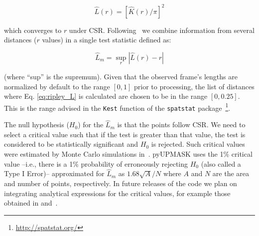 \documentclass[draft]{aa}
\begin{document}
 \begin{equation}
 \hat{L}(r) = [\hat{K}(r)/\pi]^2
 \end{equation}

 \noindent which converges to $r$ under CSR. Following~\cite{Dixon_2014} we
 combine information from several distances ($r$ values) in a single test
 statistic defined as:

 \begin{equation}
 \hat{L}_{m} = \sup_{r} |\hat{L}(r) - r|
 \label{eq:ripley_L}
 \end{equation}

 \noindent (where ``sup'' is the supremum).
 Given that the observed frame's lengths are normalized by default to the
 range $[0,1]$ prior to processing, the list of distances where Eq.
 \ref{eq:ripley_L} is calculated are chosen to be in the range $[0, 0.25]$.
 This is the range advised in the \texttt{Kest} function of the
 \texttt{spatstat}
 package~\citep{Baddeley_2015}\footnote{\url{http://spatstat.org/}}.

 The null hypothesis ($H_0$) for the $\hat{L}_{m}$ is that the points follow
 CSR. We need to select a critical value such that if the test is
 greater than that value, the test is considered to be statistically
 significant and $H_0$ is rejected.
 Such critical values were estimated by Monte Carlo simulations
 in~\cite{ripley_1979}. pyUPMASK uses the 1\% critical value --i.e.,
 there is a 1\% probability of erroneously rejecting $H_0$ (also called a
 Type I Error)-- approximated for $\hat{L}_{m}$ as $1.68\sqrt{A}/N$ where
 $A$ and $N$ are the area and number of points, respectively.
 In future releases of the code we plan on integrating analytical
 expressions for the critical values, for example those obtained in
 \cite{Lagache_2013} and~\cite{Marcon_2013}.\\
\end{document}

